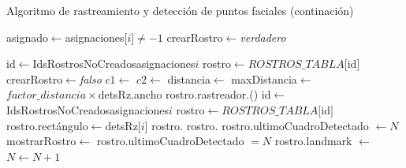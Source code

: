 \documentclass[a4paper,openright,12pt]{report}
\begin{document}
\begin{algorithm}
  \ContinuedFloat
  \caption{Algoritmo de rastreamiento y detección de puntos faciales (continación)}
  \begin{algorithmic}
            \State asignado$\leftarrow$asignaciones[$i$]$\neq-1$
            \State crearRostro$\leftarrow$\textit{verdadero}

              \State id$\gets$IdsRostrosNoCreados\lbrack asignaciones\lbrack$i$\rbrack\rbrack
              \State rostro$\gets ROSTROS\_TABLA[$id$]$
              \State crearRostro$\gets$\textit{falso}
              \State $c1\gets$
              \State $c2\gets$
              \State distancia$\gets$
              \State maxDistancia$\gets$$factor\_distancia \times $detsRz.ancho
                \State rostro.rastreador.()
              \EndIf
            \EndIf
              \State {}
            \Else
              \State id$\gets$IdsRostrosNoCreados\lbrack asignaciones\lbrack$i$\rbrack\rbrack
              \State rostro$\gets ROSTROS\_TABLA[$id$]$
                \State rostro.rectángulo$\gets$detsRz[$i$]
                \State rostro.
                \State rostro.
                \State rostro.ultimoCuadroDetectado $\gets N$
              \EndIf
            \EndIf
          \EndFor
        \EndIf
      \EndIf
        \State mostrarRostro$\gets$ rostro.ultimoCuadroDetectado $= N$
          \State rostro.landmark $\gets$ 
        \EndIf
      \EndFor
      \State $N\gets N + 1$
    \EndProcedure
  \end{algorithmic}
\end{algorithm}
\end{document}
